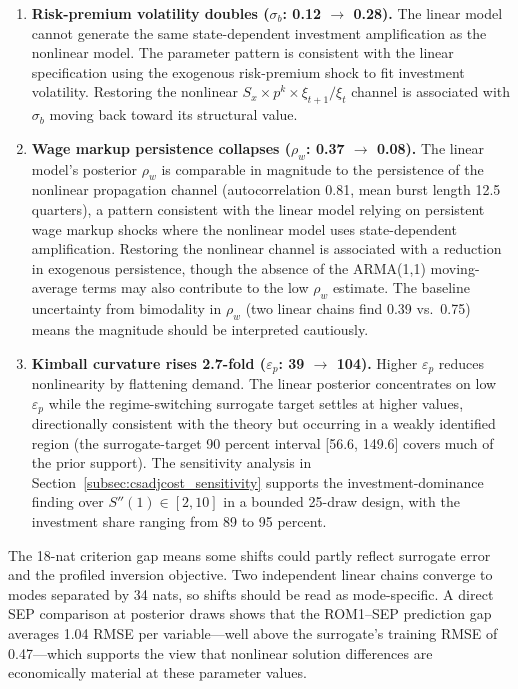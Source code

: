 \documentclass[12pt]{article}
\theoremstyle{plain}
\theoremstyle{definition}
\theoremstyle{remark}
\begin{document}
\begin{enumerate}
\item \textbf{Risk-premium volatility doubles ($\sigma_b$: 0.12 $\to$ 0.28).} The linear model cannot generate the same state-dependent investment amplification as the nonlinear model. The parameter pattern is consistent with the linear specification using the exogenous risk-premium shock to fit investment volatility. Restoring the nonlinear $S_x \times p^k \times \xi_{t+1}/\xi_t$ channel is associated with $\sigma_b$ moving back toward its structural value.

\item \textbf{Wage markup persistence collapses ($\rho_w$: 0.37 $\to$ 0.08).} The linear model's posterior $\rho_w$ is comparable in magnitude to the persistence of the nonlinear propagation channel (autocorrelation 0.81, mean burst length 12.5 quarters), a pattern consistent with the linear model relying on persistent wage markup shocks where the nonlinear model uses state-dependent amplification. Restoring the nonlinear channel is associated with a reduction in exogenous persistence, though the absence of the ARMA(1,1) moving-average terms may also contribute to the low $\rho_w$ estimate. The baseline uncertainty from bimodality in $\rho_w$ (two linear chains find 0.39 vs.\ 0.75) means the magnitude should be interpreted cautiously.

\item \textbf{Kimball curvature rises 2.7-fold ($\varepsilon_p$: 39 $\to$ 104).} Higher $\varepsilon_p$ reduces nonlinearity by flattening demand. The linear posterior concentrates on low $\varepsilon_p$ while the regime-switching surrogate target settles at higher values, directionally consistent with the theory but occurring in a weakly identified region (the surrogate-target 90 percent interval [56.6, 149.6] covers much of the prior support). The sensitivity analysis in Section~\ref{subsec:csadjcost_sensitivity} supports the investment-dominance finding over $S''(1) \in [2, 10]$ in a bounded 25-draw design, with the investment share ranging from 89 to 95 percent.
\end{enumerate}

The 18-nat criterion gap means some shifts could partly reflect surrogate error and the profiled inversion objective. Two independent linear chains converge to modes separated by 34 nats, so shifts should be read as mode-specific. A direct SEP comparison at posterior draws shows that the ROM1--SEP prediction gap averages 1.04 RMSE per variable---well above the surrogate's training RMSE of 0.47---which supports the view that nonlinear solution differences are economically material at these parameter values.
\end{document}
